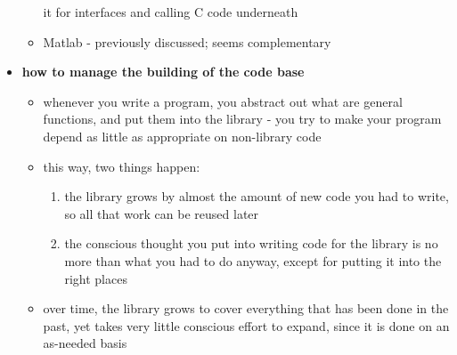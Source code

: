 \begin{itemize}
\begin{itemize}
			it for interfaces and calling C code underneath
	\item Matlab - previously discussed; seems complementary
	\end{itemize}
\item {\bf how to manage the building of the code base}
	\begin{itemize}
	\item whenever you write a program, you abstract out what are general
			functions, and put them into the library - you try to make your
			program depend as little as appropriate on non-library code
	\item this way, two things happen:
	\begin{enumerate}
		\item the library grows by almost the amount of new code you had to write,
				so all that work can be reused later
		\item the conscious thought you put into writing code for the library is
				no more than what you had to do anyway, except for putting it
				into the right places
	\end{enumerate}
	\item over time, the library grows to cover everything that has been done in
			the past, yet takes very little conscious effort to expand, since
			it is done on an as-needed basis
	\end{itemize}
\end{itemize}

\pagebreak
